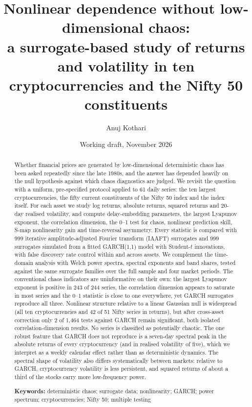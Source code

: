 \documentclass[11pt,a4paper]{article}
\title{Nonlinear dependence without low-dimensional chaos:\\[2pt]
\large a surrogate-based study of returns and volatility in ten cryptocurrencies and the Nifty 50 constituents}
\author{Anuj Kothari}
\date{Working draft, November 2026}
\begin{document}
\maketitle

\begin{abstract}
\noindent
Whether financial prices are generated by low-dimensional deterministic chaos has been asked repeatedly since the
late 1980s, and the answer has depended heavily on the null hypothesis against which chaos diagnostics are
judged. We revisit the question with a uniform, pre-specified protocol applied to 61 daily series: the ten largest
cryptocurrencies, the fifty current constituents of the Nifty 50 index and the index itself. For each asset we
study log returns, absolute returns, squared returns and 20-day realised volatility, and compute delay-embedding
parameters, the largest Lyapunov exponent, the correlation dimension, the 0--1 test for chaos, nonlinear
prediction skill, S-map nonlinearity gain and time-reversal asymmetry. Every statistic is compared with 999
iterative amplitude-adjusted Fourier transform (IAAFT) surrogates and 999 surrogates simulated from a fitted
GARCH(1,1) model with Student-$t$ innovations, with false discovery rate control within and across assets. We
complement the time-domain analysis with Welch power spectra, spectral exponents and band shares, tested against
the same surrogate families over the full sample and four market periods. The conventional chaos indicators are
uninformative on their own: the largest Lyapunov exponent is positive in 243 of 244 series, the correlation
dimension appears to saturate in most series and the 0--1 statistic is close to one everywhere, yet GARCH
surrogates reproduce all three. Nonlinear structure relative to a linear Gaussian null is widespread (all ten
cryptocurrencies and 42 of 51 Nifty series in returns), but after cross-asset correction only 2 of 1,464 tests
against GARCH remain significant, both isolated correlation-dimension results. No series is classified as
potentially chaotic. The one robust feature that GARCH does not reproduce is a seven-day spectral peak in the
absolute returns of every cryptocurrency (and in realised volatility of five), which we interpret as a weekly calendar effect rather than as deterministic
dynamics. The spectral shape of volatility also differs systematically between markets: relative to GARCH,
cryptocurrency volatility is less persistent, and squared returns of about a third of the stocks carry
more low-frequency power.

\medskip
\noindent\textbf{Keywords:} deterministic chaos; surrogate data; nonlinearity; GARCH; power spectrum;
cryptocurrencies; Nifty 50; multiple testing
\end{abstract}
\end{document}
